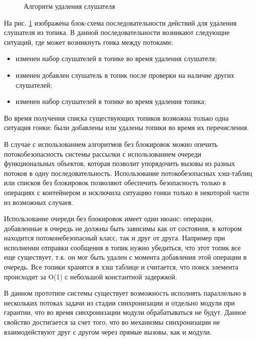 \begin{figure}[h]
	\caption{Алгоритм удаления слушателя}
	\label{im:2_2_6_remove_listener}
\end{figure}

На рис. \ref{im:2_2_6_remove_listener} изображена блок-схема последовательности действий для удаления слушателя из топика. В данной последовательности возникают следующие ситуаций, где может возникнуть гонка между потоками:

\begin{itemize}
	\item изменен набор слушателей в топике во время удаления слушателя;
	\item изменен добавлен слушатель в топик после проверки на наличие других слушателей;
	\item изменен набор слушателей в топике во время удаления топика;
\end{itemize}

Во время получения списка существующих топиков возможна только одна ситуация гонки: были добавлены или удалены топики во время их перечисления.

В случае с использованием алгоритмов без блокировок можно опечить потокобезопасность системы рассылки с использованием очереди функциональных объектов, которая позволит упорядочить вызовы из разных потоков в одну последовательность. Использование потокобезопасных хэш-таблиц или списков без блокировок позволяют обеспечить безопасность только в операциях с контейнером и исключила ситуацию гонки только в некоторой части из возможных случаев. 

Использование очереди без блокировок имеет один нюанс: операции, добавленные в очередь не должны быть зависимы как от состояния, в котором находится потоконебезопасный класс, так и друг от друга. Например при исполнении отправки сообщения в топик нужно убедиться, что этот топик все еще существует, т.к. он мог быть удален с момента добавления этой операции в очередь. Все топики хранятся в хэш таблице и считается, что поиск элемента происходит за O(1) с небольшой константной задержкой.

В данном прототипе системы существует возможность исполнять параллельно в нескольких потоках задачи из стадии синхронизации и отдельно модули при гарантии, что во время синхронизации модули обрабатываться не будут. Данное свойство достигается за счет того, что во механизмы синхронизации не взаимодействуют друг с другом через прямые вызовы, как и модули.

